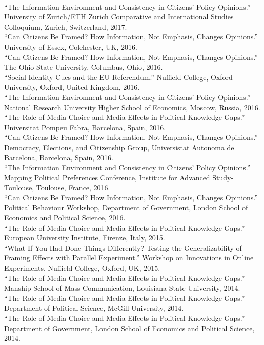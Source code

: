 \documentclass[12pt]{article}
\renewcommand{\section}[1]{\pagebreak[3]%
    \llap{\scshape\smash{\parbox[t]{\marginparwidth}{\raggedright {\color{lg}#1}}}}%
    \vspace{-\baselineskip}\par}
\newcommand{\topic}[1]{\pagebreak[3]\indent {\color{lg}{\footnotesize #1 }}\\}
\newcommand{\entry}[1]{\indent {\color{lg}\guillemotright}\hspace{2pt}#1\vspace{.25em}\\}
\begin{document}
\section{Invited\\Presentations\\\& Conference\\Papers}
\topic{Invited Presentations}
	\entry{``The Information Environment and Consistency in Citizens' Policy Opinions.'' University of Zurich/ETH Zurich Comparative and International Studies Colloquium, Zurich, Switzerland, 2017.}
	\entry{``Can Citizens Be Framed? How Information, Not Emphasis, Changes Opinions.'' University of Essex, Colchester, UK, 2016.}
	\entry{``Can Citizens Be Framed? How Information, Not Emphasis, Changes Opinions.'' The Ohio State University, Columbus, Ohio, 2016.}
	\entry{``Social Identity Cues and the EU Referendum.'' Nuffield College, Oxford University, Oxford, United Kingdom, 2016.}
	\entry{``The Information Environment and Consistency in Citizens' Policy Opinions.'' National Research University Higher School of Economics, Moscow, Russia, 2016.}
	\entry{``The Role of Media Choice and Media Effects in Political Knowledge Gaps.'' Universitat Pompeu Fabra, Barcelona, Spain, 2016.}
	\entry{``Can Citizens Be Framed? How Information, Not Emphasis, Changes Opinions.'' Democracy, Elections, and Citizenship Group, Universistat Autonoma de Barcelona, Barcelona, Spain, 2016.}
	\entry{``The Information Environment and Consistency in Citizens' Policy Opinions.'' Mapping Political Preferences Conference, Institute for Advanced Study-Toulouse, Toulouse, France, 2016.}
	\entry{``Can Citizens Be Framed? How Information, Not Emphasis, Changes Opinions.'' Political Behaviour Workshop, Department of Government, London School of Economics and Political Science, 2016.}
	\entry{``The Role of Media Choice and Media Effects in Political Knowledge Gaps.'' European University Institute, Firenze, Italy, 2015.}
	\entry{``What If You Had Done Things Differently? Testing the Generalizability of Framing Effects with Parallel Experiment.'' Workshop on Innovations in Online Experiments, Nuffield College, Oxford, UK, 2015.}
	\entry{``The Role of Media Choice and Media Effects in Political Knowledge Gaps.'' Manship School of Mass Communication, Louisiana State University, 2014.}
	\entry{``The Role of Media Choice and Media Effects in Political Knowledge Gaps.'' Department of Political Science, McGill University, 2014.}
	\entry{``The Role of Media Choice and Media Effects in Political Knowledge Gaps.'' Department of Government, London School of Economics and Political Science, 2014.}
\end{document}
